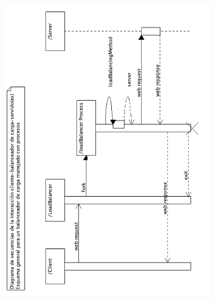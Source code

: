 %

      \newpage
 \begin{figure}[h]
        \centering
        \includegraphics[scale=0.5]{diagramas/SequenceDiagram2.png}
      \end{figure}
